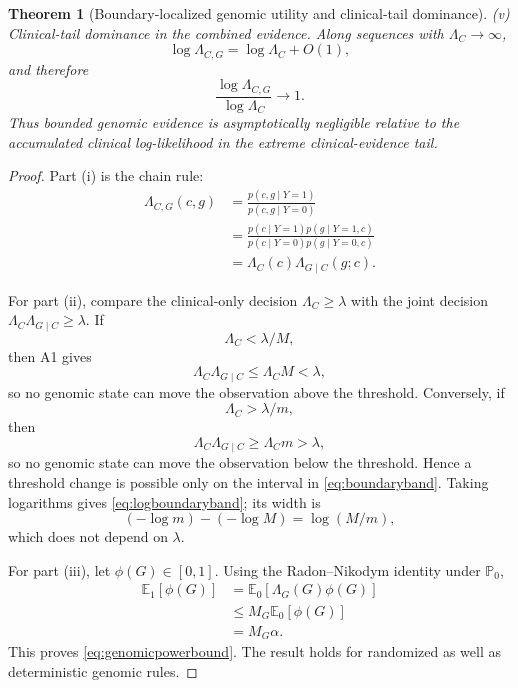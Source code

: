 \documentclass[journal]{IEEEtran}
\newtheorem{theorem}{Theorem}
\newcommand{\Pzero}{\mathbb{P}_0}
\newcommand{\Eone}{\mathbb{E}_1}
\newcommand{\Ezero}{\mathbb{E}_0}
\newcommand{\LR}{\Lambda}
\begin{document}
\begin{theorem}[Boundary-localized genomic utility and clinical-tail dominance]
\emph{(v) Clinical-tail dominance in the combined evidence.} Along sequences with $\LR_C\to\infty$,
\begin{equation}
\log \LR_{C,G}
=\log \LR_C+O(1),
\end{equation}
and therefore
\begin{equation}
\boxed{
\frac{\log\LR_{C,G}}{\log\LR_C}\to1.
}
\label{eq:taildominance}
\end{equation}
Thus bounded genomic evidence is asymptotically negligible relative to the accumulated clinical log-likelihood in the extreme clinical-evidence tail.
\end{theorem}

\begin{proof}
Part (i) is the chain rule:
\begin{align}
\LR_{C,G}(c,g)
&=\frac{p(c,g\mid Y=1)}{p(c,g\mid Y=0)}\\
&=\frac{p(c\mid Y=1)p(g\mid Y=1,c)}
        {p(c\mid Y=0)p(g\mid Y=0,c)}\\
&=\LR_C(c)\LR_{G\mid C}(g;c).
\end{align}

For part (ii), compare the clinical-only decision $\LR_C\ge\lambda$ with the joint decision $\LR_C\LR_{G\mid C}\ge\lambda$. If
\begin{equation}
\LR_C<\lambda/M,
\end{equation}
then A1 gives
\begin{equation}
\LR_C\LR_{G\mid C}
\le \LR_C M
<\lambda,
\end{equation}
so no genomic state can move the observation above the threshold. Conversely, if
\begin{equation}
\LR_C>\lambda/m,
\end{equation}
then
\begin{equation}
\LR_C\LR_{G\mid C}
\ge \LR_C m
>\lambda,
\end{equation}
so no genomic state can move the observation below the threshold. Hence a threshold change is possible only on the interval in \eqref{eq:boundaryband}. Taking logarithms gives \eqref{eq:logboundaryband}; its width is
\begin{equation}
(-\log m)-(-\log M)=\log(M/m),
\end{equation}
which does not depend on $\lambda$.

For part (iii), let $\phi(G)\in[0,1]$. Using the Radon--Nikodym identity under $\Pzero$,
\begin{align}
\Eone[\phi(G)]
&=\Ezero[\LR_G(G)\phi(G)]\\
&\le M_G\Ezero[\phi(G)]\\
&=M_G\alpha.
\end{align}
This proves \eqref{eq:genomicpowerbound}. The result holds for randomized as well as deterministic genomic rules.


\end{proof}
\end{document}
